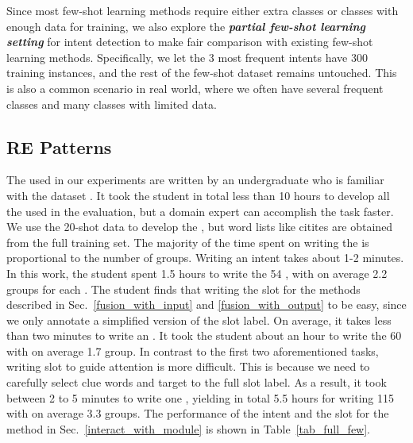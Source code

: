 Since most few-shot learning methods require either extra classes or classes with enough data for training, we also explore the \textbf{\emph{partial few-shot learning setting}} for intent detection to make fair comparison with existing few-shot learning methods. Specifically, we let the 3 most frequent intents have 300 training instances, and the rest of the few-shot dataset remains untouched.
This is also a common scenario in real world, where we often have several frequent classes and many classes with limited data.

\subsection{RE Patterns}
\label{re_in_exp} The \REs used in our experiments are written by an undergraduate who is familiar with the dataset . It took the
student in total less than 10 hours to develop all the \REs used in the evaluation, but a domain expert can accomplish the task faster. We
use the 20-shot data to develop the \REs, but word lists like citites are obtained from the full training set. The majority of the time
spent on writing the \REs is proportional to the number of \RE groups. Writing an intent \RE takes about 1-2 minutes. In this
work, the student spent 1.5 hours to write the 54 \REs, with on average 2.2 \RE groups for each \RE. The student finds that
writing the slot \RE for the methods described in Sec.~\ref{fusion_with_input} and \ref{fusion_with_output} to be easy, since we only
annotate a simplified version of the slot label. On average, it takes less than two minutes to write an \RE. It took the
student about an hour to write the 60 \REs with on average 1.7 \RE group. 
In contrast to the first two aforementioned
tasks, writing slot \REs to guide attention is more difficult. This is because we need to carefully select clue words and
target to the full slot label. As a result, it took between 2 to 5 minutes to write one \RE, yielding in total 5.5 hours for writing
115 \REs with on average 3.3 \RE groups. The performance of the intent \REs and the slot \REs for the method in
Sec.~\ref{interact_with_module} is shown in Table~\ref{tab_full_few}. 


